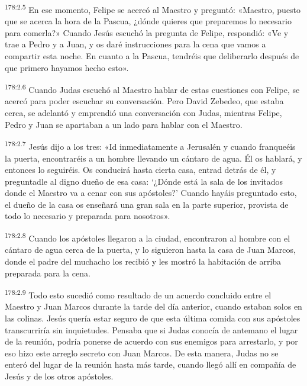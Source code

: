 \par 
\textsuperscript{178:2.5} En ese momento, Felipe se acercó al Maestro y preguntó: «Maestro, puesto que se acerca la hora de la Pascua, ¿dónde quieres que preparemos lo necesario para comerla?» Cuando Jesús escuchó la pregunta de Felipe, respondió: «Ve y trae a Pedro y a Juan, y os daré instrucciones para la cena que vamos a compartir esta noche. En cuanto a la Pascua, tendréis que deliberarlo después de que primero hayamos hecho esto».

\par 
\textsuperscript{178:2.6} Cuando Judas escuchó al Maestro hablar de estas cuestiones con Felipe, se acercó para poder escuchar su conversación. Pero David Zebedeo, que estaba cerca, se adelantó y emprendió una conversación con Judas, mientras Felipe, Pedro y Juan se apartaban a un lado para hablar con el Maestro.

\par 
\textsuperscript{178:2.7} Jesús dijo a los tres: «Id inmediatamente a Jerusalén y cuando franqueéis la puerta, encontraréis a un hombre llevando un cántaro de agua. Él os hablará, y entonces lo seguiréis. Os conducirá hasta cierta casa, entrad detrás de él, y preguntadle al digno dueño de esa casa: `¿Dónde está la sala de los invitados donde el Maestro va a cenar con sus apóstoles?' Cuando hayáis preguntado esto, el dueño de la casa os enseñará una gran sala en la parte superior, provista de todo lo necesario y preparada para nosotros».

\par 
\textsuperscript{178:2.8} Cuando los apóstoles llegaron a la ciudad, encontraron al hombre con el cántaro de agua cerca de la puerta, y lo siguieron hasta la casa de Juan Marcos, donde el padre del muchacho los recibió y les mostró la habitación de arriba preparada para la cena.

\par 
\textsuperscript{178:2.9} Todo esto sucedió como resultado de un acuerdo concluido entre el Maestro y Juan Marcos durante la tarde del día anterior, cuando estaban solos en las colinas. Jesús quería estar seguro de que esta última comida con sus apóstoles transcurriría sin inquietudes. Pensaba que si Judas conocía de antemano el lugar de la reunión, podría ponerse de acuerdo con sus enemigos para arrestarlo, y por eso hizo este arreglo secreto con Juan Marcos. De esta manera, Judas no se enteró del lugar de la reunión hasta más tarde, cuando llegó allí en compañía de Jesús y de los otros apóstoles.

